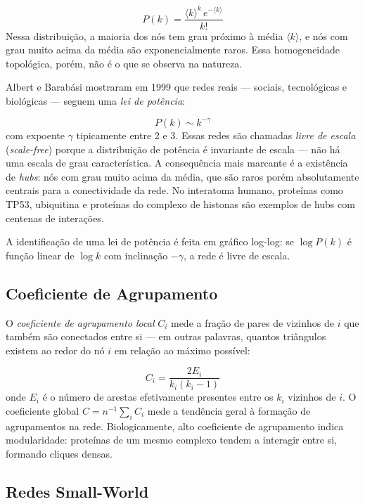 \begin{equation}
P(k) = \frac{\langle k \rangle^k \, e^{-\langle k \rangle}}{k!}
\end{equation}
Nessa distribuição, a maioria dos nós tem grau próximo à média $\langle k \rangle$, e
nós com grau muito acima da média são exponencialmente raros. Essa homogeneidade topológica,
porém, não é o que se observa na natureza.

Albert e Barabási mostraram em 1999 que redes reais --- sociais, tecnológicas e biológicas
--- seguem uma \emph{lei de potência}:

\begin{equation}
P(k) \sim k^{-\gamma}
\end{equation}
com expoente $\gamma$ tipicamente entre 2 e 3. Essas redes são chamadas \emph{livre de
escala} (\textit{scale-free}) porque a distribuição de potência é invariante de escala
--- não há uma escala de grau característica. A consequência mais marcante é a existência
de \emph{hubs}: nós com grau muito acima da média, que são raros porém absolutamente
centrais para a conectividade da rede. No interatoma humano, proteínas como TP53, ubiquitina
e proteínas do complexo de histonas são exemplos de hubs com centenas de interações.

A identificação de uma lei de potência é feita em gráfico log-log: se $\log P(k)$ é função
linear de $\log k$ com inclinação $-\gamma$, a rede é livre de escala.

\subsection{Coeficiente de Agrupamento}

O \emph{coeficiente de agrupamento local} $C_i$ mede a fração de pares de vizinhos de $i$
que também são conectados entre si --- em outras palavras, quantos triângulos existem
ao redor do nó $i$ em relação ao máximo possível:

\begin{equation}
C_i = \frac{2 E_i}{k_i(k_i - 1)}
\end{equation}
onde $E_i$ é o número de arestas efetivamente presentes entre os $k_i$ vizinhos de $i$.
O coeficiente global $C = n^{-1} \sum_i C_i$ mede a tendência geral à formação de
agrupamentos na rede. Biologicamente, alto coeficiente de agrupamento indica modularidade:
proteínas de um mesmo complexo tendem a interagir entre si, formando cliques densas.


\subsection{Redes Small-World}

